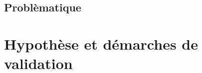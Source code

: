 \documentclass[a4paper]{article}
\begin{document}
\begin{comment}

MANSUBA est un jeu de plateau qui a un but similaire au jeu de Shtranj mais avec des conditions de victoire légèrement différente. 
Le nombre de joueur , le nombre de pions et la taille du plateau sont bien définis dans le fichier encadrant la géometrie du sujet (geometry.h)
BOARD : 
Le plateau de jeu et la combinaison d'un monde et d'une relation .
  WORLD : 
Le monde représente les positions accessibles pour le jeu qui est dans un sens algorithmique une liste de cases . Ce monde est initialisé par la structure world_t ...
  RELATION : 
Les voisins sont les cases environant directement une case en question et qui sont dans l'une des directions enuméres dans le fichier geometry et qui dépendent de leurs
positions dans le monde (enum dir_t) ...
une relation est l'ensemble des possibilité d'avoir un mouvement directe d'une case à l'autre dans une direction permise par les régles actuelles du jeu pour une case choisie.
 INITIALISATION : 
L'état du BOARD qu'on traite dans le début de sujet sera une grille 2D avec deux joueurs et 8 directions d'orientation .

\end{comment}

\subsection{Problèmatique}
\begin{comment}
Le but de notre projet sera de jouer une partie de jeu aléatoire, puis rendre l'algorithme de plus en plus flexible et général
et l'orienter vers la victoire. 

\end{comment}

\section{Hypothèse et démarches de validation}


\section{}
\end{document}
